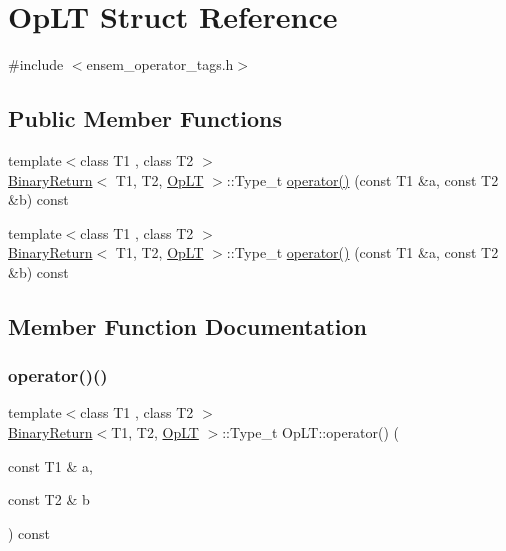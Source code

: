\hypertarget{structOpLT}{}\section{Op\+LT Struct Reference}
\label{structOpLT}


{\ttfamily \#include $<$ensem\+\_\+operator\+\_\+tags.\+h$>$}

\subsection*{Public Member Functions}
\begin{DoxyCompactItemize}
\item 
{\footnotesize template$<$class T1 , class T2 $>$ }\\\mbox{\hyperlink{structBinaryReturn}{Binary\+Return}}$<$ T1, T2, \mbox{\hyperlink{structOpLT}{Op\+LT}} $>$\+::Type\+\_\+t \mbox{\hyperlink{structOpLT_a2f128753d950366b68138d206e76ceec}{operator()}} (const T1 \&a, const T2 \&b) const
\item 
{\footnotesize template$<$class T1 , class T2 $>$ }\\\mbox{\hyperlink{structBinaryReturn}{Binary\+Return}}$<$ T1, T2, \mbox{\hyperlink{structOpLT}{Op\+LT}} $>$\+::Type\+\_\+t \mbox{\hyperlink{structOpLT_a2f128753d950366b68138d206e76ceec}{operator()}} (const T1 \&a, const T2 \&b) const
\end{DoxyCompactItemize}


\subsection{Member Function Documentation}
\mbox{\label{structOpLT_a2f128753d950366b68138d206e76ceec}} 
\subsubsection{\texorpdfstring{operator()()}{operator()()}\hspace{0.1cm}{\footnotesize\ttfamily [1/2]}}
{\footnotesize\ttfamily template$<$class T1 , class T2 $>$ \\
\mbox{\hyperlink{structBinaryReturn}{Binary\+Return}}$<$T1, T2, \mbox{\hyperlink{structOpLT}{Op\+LT}} $>$\+::Type\+\_\+t Op\+L\+T\+::operator() (\begin{DoxyParamCaption}\item[{const T1 \&}]{a,  }\item[{const T2 \&}]{b }\end{DoxyParamCaption}) const\hspace{0.3cm}{\ttfamily [inline]}}

